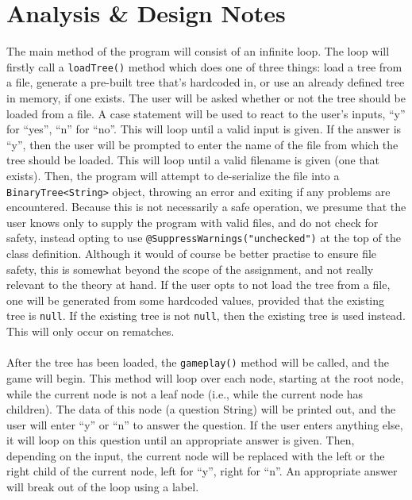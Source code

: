 \documentclass[a4paper]{article}
\begin{document}
\section{Analysis \& Design Notes}
The main method of the program will consist of an infinite loop. 
The loop will firstly call a \verb|loadTree()| method which does one of three things: load a tree from a file, generate a pre-built tree that's hardcoded in, or use an already defined tree in memory, if one
exists. 
The user will be asked whether or not the tree should be loaded from a file.
A case statement will be used to react to the user's inputs, ``y'' for ``yes'', ``n'' for ``no''.
This will loop until a valid input is given.
If the answer is ``y'', then the user will be prompted to enter the name of the file from which the tree should be loaded. 
This will loop until a valid filename is given (one that exists). 
Then, the program will attempt to de-serialize the file into a \verb|BinaryTree<String>| object, throwing an error and exiting if any problems are encountered. 
Because this is not necessarily a safe operation, we presume that the user knows only to supply the program with valid files, and do not check for safety, instead opting to use \verb|@SuppressWarnings("unchecked")|
at the top of the class definition. 
Although it would of course be better practise to ensure file safety, this is somewhat beyond the scope of the assignment, and not really relevant to the theory at hand.
If the user opts to not load the tree from a file, one will be generated from some hardcoded values, provided that the existing tree is \verb|null|. 
If the existing tree is not \verb|null|, then the existing tree is used instead. 
This will only occur on rematches. 
\\\\
After the tree has been loaded, the \verb|gameplay()| method will be called, and the game will begin.
This method will loop over each node, starting at the root node, while the current node is not a leaf node (i.e., while the current node has children).
The data of this node (a question String) will be printed out, and the user will enter ``y'' or ``n'' to answer the question. 
If the user enters anything else, it will loop on this question until an appropriate answer is given. 
Then, depending on the input, the current node will be replaced with the left or the right child of the current node, left for ``y'', right for ``n''.
An appropriate answer will break out of the loop using a label.
\\\\
\end{document}

